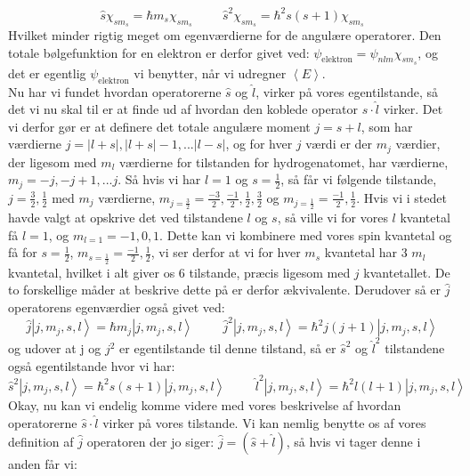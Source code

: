 \documentclass[../../Atom-ogMolekylefysik.tex]{subfiles}
\begin{document}
\begin{equation}
   \hat{s}\chi_{sm_s}=\hbar m_s\chi_{sm_s} \hspace{1cm}\hat{s}^2\chi_{sm_s}=\hbar^2s(s+1)\chi_{sm_s} 
\end{equation}
Hvilket minder rigtig meget om egenværdierne for de angulære operatorer. Den totale bølgefunktion for en elektron er derfor givet ved:
$\psi_\text{elektron}=\psi_{nlm}\chi_{sm_s}$, og det er egentlig $\psi_\text{elektron}$ vi benytter, når vi udregner $\left<E\right>$. \\
Nu har vi fundet hvordan operatorerne $\hat{s}$ og $\hat{l}$, virker på vores egentilstande, så det vi nu skal til er at finde ud af hvordan den koblede operator $\hat{s}\cdot\hat{l}$ virker. Det vi derfor gør er at definere det totale angulære moment $j=s+l$, som har værdierne $j=|l+s|, |l+s|-1, ... |l-s|$, og for hver $j$ værdi er der $m_j$ værdier, der ligesom med $m_l$ værdierne for tilstanden for hydrogenatomet, har værdierne, $m_{j}=-j, -j+1, ... j$. Så hvis vi har $l=1$ og $s=\frac{1}{2}$, så får vi følgende tilstande, $j=\frac{3}{2}, \frac{1}{2}$ med $m_j$ værdierne, $m_{j=\frac{3}{2}}=\frac{-3}{2}, \frac{-1}{2},\frac{1}{2},\frac{3}{2}$ og $m_{j=\frac{1}{2}}=\frac{-1}{2},\frac{1}{2}$. Hvis vi i stedet havde valgt at opskrive det ved tilstandene $l$ og $s$, så ville vi for vores $l$ kvantetal få $l=1$, og $m_{l=1}=-1, 0, 1$. Dette kan vi kombinere med vores spin kvantetal og få for $s=\frac{1}{2}$, $m_{s=\frac{1}{2}}=\frac{-1}{2}, \frac{1}{2}$, vi ser derfor at vi for hver $m_s$ kvantetal har 3 $m_l$ kvantetal, hvilket i alt giver os 6 tilstande, præcis ligesom med $j$ kvantetallet. De to forskellige måder at beskrive dette på er derfor ækvivalente. Derudover så er $\hat{j}$ operatorens egenværdier også givet ved:
\begin{equation}
    \hat{j}\left|j, m_j, s, l\right>=\hbar m_j\left|j, m_j, s, l\right> \hspace{1cm} \hat{j}^2\left|j, m_j, s, l\right>=\hbar^2 j(j+1)\left|j, m_j, s, l\right>
\end{equation}
og udover at j og $j^2$ er egentilstande til denne tilstand, så er $\hat{s}^2$ og $\hat{l}^2$ tilstandene også egentilstande hvor vi har:
\begin{equation}
    \hat{s}^2\left|j, m_j, s, l\right>=\hbar^2 s(s+1)\left|j, m_j, s, l\right>\hspace{1cm}\hat{l}^2\left|j, m_j, s, l\right>=\hbar^2 l(l+1)\left|j, m_j, s, l\right>
\end{equation}
Okay, nu kan vi endelig komme videre med vores beskrivelse af hvordan operatorerne $\hat{s}\cdot\hat{l}$ virker på vores tilstande. Vi kan nemlig benytte os af vores definition af $\hat{j}$ operatoren der jo siger: $\hat{j}=(\hat{s}+\hat{l})$, så hvis vi tager denne i anden får vi: 
\end{document}

